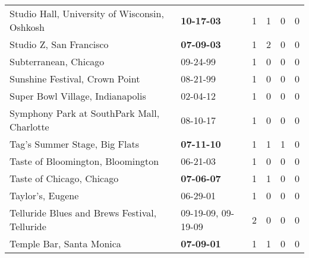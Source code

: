 \begin{longtable}{p{}p{}p{}p{}p{}p{}}
                                Studio Hall, University of Wisconsin, Oshkosh &                                       \textbf{10-17-03\textsuperscript{}} &  1 &  1 &  0 &  0 \\
                                                      Studio Z, San Francisco &                                       \textbf{07-09-03\textsuperscript{}} &  1 &  2 &  0 &  0 \\
                                                        Subterranean, Chicago &                                                09-24-99\textsuperscript{} &  1 &  0 &  0 &  0 \\
                                               Sunshine Festival, Crown Point &                                                08-21-99\textsuperscript{} &  1 &  0 &  0 &  0 \\
                                             Super Bowl Village, Indianapolis &                                                02-04-12\textsuperscript{} &  1 &  0 &  0 &  0 \\
                                   Symphony Park at SouthPark Mall, Charlotte &                                                08-10-17\textsuperscript{} &  1 &  0 &  0 &  0 \\
                                                Tag's Summer Stage, Big Flats &                                       \textbf{07-11-10\textsuperscript{}} &  1 &  1 &  1 &  0 \\
                                            Taste of Bloomington, Bloomington &                                                06-21-03\textsuperscript{} &  1 &  0 &  0 &  0 \\
                                                    Taste of Chicago, Chicago &                                       \textbf{07-06-07\textsuperscript{}} &  1 &  1 &  0 &  0 \\
                                                             Taylor's, Eugene &                                                06-29-01\textsuperscript{} &  1 &  0 &  0 &  0 \\
                                Telluride Blues and Brews Festival, Telluride &                    09-19-09\textsuperscript{}, 09-19-09\textsuperscript{} &  2 &  0 &  0 &  0 \\
                                                     Temple Bar, Santa Monica &                                       \textbf{07-09-01\textsuperscript{}} &  1 &  1 &  0 &  0 \\

\end{longtable}
